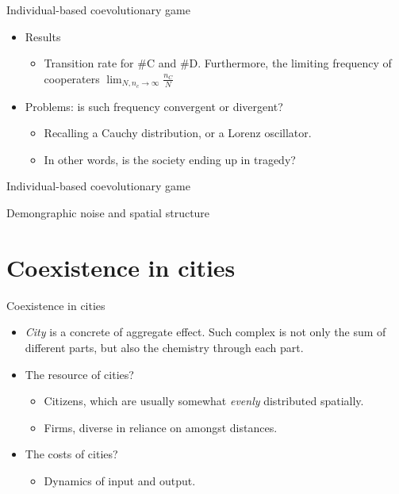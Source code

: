 \documentclass{beamer}
\begin{document}
\begin{frame}{Individual-based coevolutionary game}
    \begin{itemize}
        \item Results
        \begin{itemize}
            \item Transition rate for \#C and \#D. Furthermore, the limiting frequency of cooperaters $\lim_{N,n_c\rightarrow \infty}\frac{n_C}{N} $
        \end{itemize}
        \item Problems: is such frequency convergent or divergent?
        \begin{itemize}
            \item Recalling a Cauchy distribution, or a Lorenz oscillator.
            \item In other words, is the society ending up in tragedy?
        \end{itemize}
    \end{itemize}
\end{frame}

\begin{frame}{Individual-based coevolutionary game}

\end{frame}

\begin{frame}{Demongraphic noise and spatial structure}

\end{frame}

\section{Coexistence in cities}

\begin{frame}{Coexistence in cities}
    \begin{itemize}
        \item \emph{City} is a concrete of aggregate effect. Such complex is not only the sum of different parts, but also the chemistry through each part.
        \vspace{0.5cm}
        \item The resource of cities?
        \begin{itemize}
            \item Citizens, which are usually somewhat \emph{evenly} distributed spatially.
            \item Firms, diverse in reliance on amongst distances.
        \end{itemize}
        \item The costs of cities?
        \begin{itemize}
            \item Dynamics of input and output.
        \end{itemize}
    \end{itemize}
\end{frame}
\end{document}
